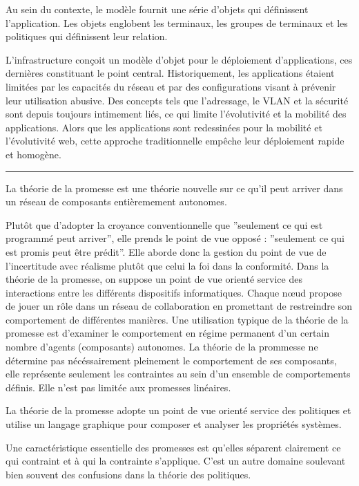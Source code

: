Au sein du contexte, le modèle fournit une série d'objets qui définissent
l'application. Les objets englobent les terminaux, les groupes de terminaux et
les politiques qui définissent leur relation.

L'infrastructure conçoit un modèle d'objet pour le déploiement d'applications,
ces dernières constituant le point central. Historiquement, les applications
étaient limitées par les capacités du réseau et par des configurations visant à
prévenir leur utilisation abusive. Des concepts tels que l'adressage, le VLAN et
la sécurité sont depuis toujours intimement liés, ce qui limite l'évolutivité et
la mobilité des applications. Alors que les applications sont redessinées pour
la mobilité et l'évolutivité web, cette approche traditionnelle empêche leur
déploiement rapide et homogène.

\noindent\rule{8cm}{0.4pt}

La théorie de la promesse est une théorie nouvelle sur ce qu'il peut arriver
dans un réseau de composants entièremement autonomes.

Plutôt que d'adopter la croyance conventionnelle que ''seulement ce qui est
programmé peut arriver'', elle prends le point de vue opposé : ''seulement ce
qui est promis peut être prédit''. Elle aborde donc la gestion du point de vue
de l'incertitude avec réalisme plutôt que celui la foi dans la conformité. Dans
la théorie de la promesse, on suppose un point de vue orienté service des
interactions entre les différents dispositifs informatiques. Chaque nœud propose
de jouer un rôle dans un réseau de collaboration en promettant de restreindre
son comportement de différentes manières. Une utilisation typique de la théorie
de la promesse est d'examiner le comportement en régime permanent d'un certain
nombre d'agents (composants) autonomes. La théorie de la prommesse ne détermine
pas nécéssairement pleinement le comportement de ses composants, elle représente
seulement les contraintes au sein d'un ensemble de comportements définis. Elle
n'est pas limitée aux promesses linéaires.

La théorie de la promesse adopte un point de vue orienté service des politiques
et utilise un langage graphique pour composer et analyser les propriétés
systèmes.

Une caractéristique essentielle des promesses est qu'elles séparent clairement
ce qui contraint et à qui la contrainte s'applique. C'est un autre domaine
soulevant bien souvent des confusions dans la théorie des politiques.

